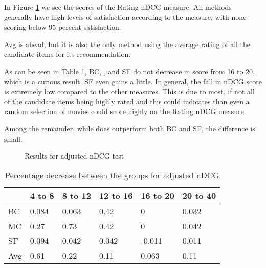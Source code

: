 In Figure \ref{fig:andcg} we see the scores of the Rating nDCG measure. All methods generally have high levels of satisfaction according to the measure, with none scoring below 95 percent satisfaction.

Avg is ahead, but it is also the only method using the average rating of all the candidate items for its recommendation.

As can be seen in Table \ref{tbl:andcg}, BC, \MC, and SF do not decrease in score from 16 to 20, which is a curious result. SF even gains a little. In general, the fall in nDCG score is extremely low compared to the other measures. This is due to most, if not all of the candidate items being highly rated and this could indicates than even a random selection of movies could score highly on the Rating nDCG measure.

Among the remainder, while \MC does outperform both BC and SF, the difference is small.
\begin{figure}[H]
	\caption{Results for adjusted nDCG test}\label{fig:andcg}
\end{figure}

\begin{table}[H]
	\centering
	\label{tbl:andcg}
	\begin{tabular}{|l|lllll|}\hline
		& 4 to 8 & 8 to 12 & 12 to 16 & 16 to 20 & 20 to 40 \\\hline
		BC 	& 0.084	& 0.063	& 0.42	& 0		& 0.032 \\
		MC  & 0.27	& 0.73	& 0.42	& 0		& 0.042 \\
		SF  & 0.094	& 0.042	& 0.042	&-0.011	& 0.011 \\
		Avg	& 0.61	& 0.22 	& 0.11	& 0.063	& 0.11  \\ \hline
	\end{tabular}
	\caption{Percentage decrease between the groups for adjusted nDCG}
\end{table}